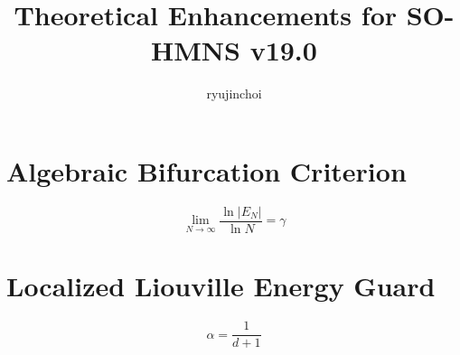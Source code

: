 \documentclass{article}
\title{Theoretical Enhancements for SO-HMNS v19.0}
\author{ryujinchoi}
\begin{document}
\maketitle
\section{Algebraic Bifurcation Criterion}
\begin{equation}
\lim_{N \to \infty} \frac{\ln |E_N|}{\ln N} = \gamma
\end{equation}
\section{Localized Liouville Energy Guard}
\begin{equation}
\alpha = \frac{1}{d+1}
\end{equation}
\end{document}
